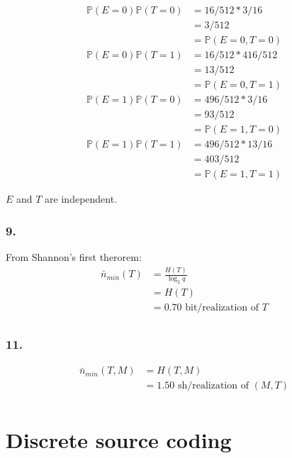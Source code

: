 \documentclass{article}
\newcommand{\1}{\mathbf{1}}
\renewcommand{\P}{\mathbb{P}}
\begin{document}
\begin{align*}
  \P(E = 0) \P(T = 0)
   & = 16/512 * 3/16    \\
   & = 3/512            \\
   & = \P(E = 0, T = 0)
\end{align*}
\begin{align*}
  \P(E = 0) \P(T = 1)
   & = 16/512 * 416/512 \\
   & = 13/512           \\
   & = \P(E = 0, T = 1)
\end{align*}
\begin{align*}
  \P(E = 1) \P(T = 0)
   & = 496/512 * 3/16   \\
   & = 93/512           \\
   & = \P(E = 1, T = 0)
\end{align*}
\begin{align*}
  \P(E = 1) \P(T = 1)
   & = 496/512 * 13/16  \\
   & = 403/512          \\
   & = \P(E = 1, T = 1)
\end{align*}

$E$ and $T$ are independent.


\subsubsection{9.}
From Shannon's first therorem:
\begin{align*}
  \bar{n}_{min}(T)
   & = \frac{H(T)}{\log_2 q}             \\
   & = H(T)                              \\
   & = 0.70 \text{ bit/realization of }T \\
\end{align*}


\subsubsection{11.}
\begin{align*}
  \bar{n}_{min}(T, M)
   & = H(T, M)                                \\
   & = 1.50 \text{ sh/realization of } (M, T) \\
\end{align*}


\section{Discrete source coding}
\end{document}

